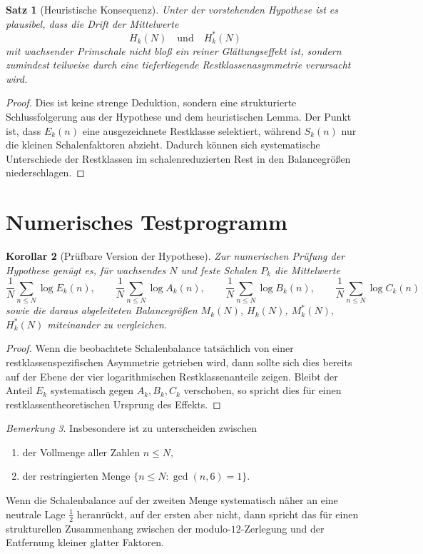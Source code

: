 \documentclass[11pt,a4paper]{article}
\newtheorem{satz}{Satz}
\newtheorem{korollar}[satz]{Korollar}
\theoremstyle{definition}
\theoremstyle{remark}
\newtheorem{bemerkung}[satz]{Bemerkung}
\begin{document}
	\begin{satz}[Heuristische Konsequenz]
		Unter der vorstehenden Hypothese ist es plausibel, dass die Drift der Mittelwerte
		\[
		H_k(N)\quad\text{und}\quad H_k^\ast(N)
		\]
		mit wachsender Primschale nicht bloß ein reiner Glättungseffekt ist, sondern zumindest teilweise
		durch eine tieferliegende Restklassenasymmetrie verursacht wird.
	\end{satz}
	
	\begin{proof}
		Dies ist keine strenge Deduktion, sondern eine strukturierte Schlussfolgerung aus der Hypothese
		und dem heuristischen Lemma. Der Punkt ist, dass \(E_k(n)\) eine ausgezeichnete Restklasse
		selektiert, während \(S_k(n)\) nur die kleinen Schalenfaktoren abzieht. Dadurch können sich
		systematische Unterschiede der Restklassen im schalenreduzierten Rest in den Balancegrößen
		niederschlagen.
	\end{proof}
	
	\section{Numerisches Testprogramm}
	
	\begin{korollar}[Prüfbare Version der Hypothese]
		Zur numerischen Prüfung der Hypothese genügt es, für wachsendes \(N\) und feste Schalen \(P_k\)
		die Mittelwerte
		\[
		\frac{1}{N}\sum_{n\le N}\log E_k(n),\qquad
		\frac{1}{N}\sum_{n\le N}\log A_k(n),\qquad
		\frac{1}{N}\sum_{n\le N}\log B_k(n),\qquad
		\frac{1}{N}\sum_{n\le N}\log C_k(n)
		\]
		sowie die daraus abgeleiteten Balancegrößen \(M_k(N)\), \(H_k(N)\), \(M_k^\ast(N)\),
		\(H_k^\ast(N)\) miteinander zu vergleichen.
	\end{korollar}
	
	\begin{proof}
		Wenn die beobachtete Schalenbalance tatsächlich von einer restklassenspezifischen Asymmetrie
		getrieben wird, dann sollte sich dies bereits auf der Ebene der vier logarithmischen
		Restklassenanteile zeigen. Bleibt der Anteil \(E_k\) systematisch gegen \(A_k,B_k,C_k\)
		verschoben, so spricht dies für einen restklassentheoretischen Ursprung des Effekts.
	\end{proof}
	
	\begin{bemerkung}
		Insbesondere ist zu unterscheiden zwischen
		\begin{enumerate}
			\item der Vollmenge aller Zahlen \(n\le N\),
			\item der restringierten Menge \(\{n\le N:\gcd(n,6)=1\}\).
		\end{enumerate}
		Wenn die Schalenbalance auf der zweiten Menge systematisch näher an eine neutrale Lage
		\(\frac12\) heranrückt, auf der ersten aber nicht, dann spricht das für einen strukturellen
		Zusammenhang zwischen der modulo-\(12\)-Zerlegung und der Entfernung kleiner glatter Faktoren.
	\end{bemerkung}
	
\end{document}
